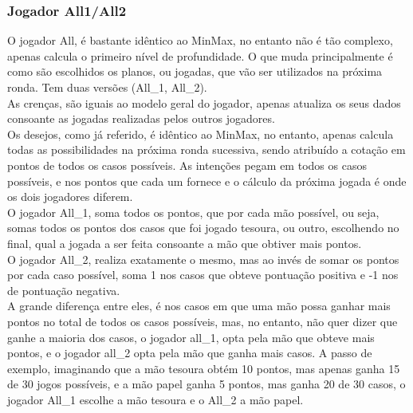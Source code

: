 \documentclass[12pt]{article}
\begin{document}
	\subsubsection*{Jogador All1/All2}
    O jogador All, é bastante idêntico ao MinMax, no entanto não é tão complexo, apenas calcula o primeiro nível de profundidade. O que muda principalmente é como são escolhidos os planos, ou jogadas, que vão ser utilizados na próxima ronda. Tem duas versões (All\_1, All\_2).\\
    As crenças, são iguais ao modelo geral do jogador, apenas atualiza os seus dados consoante as jogadas realizadas pelos outros jogadores.\\
    Os desejos, como já referido, é idêntico ao MinMax, no entanto, apenas calcula todas as possibilidades na próxima ronda sucessiva, sendo atribuído a cotação em pontos de todos os casos possíveis.
    As intenções pegam em todos os casos possíveis, e nos pontos que cada um fornece e o cálculo da próxima jogada é onde os dois jogadores diferem.\\
    O jogador All\_1, soma todos os pontos, que por cada mão possível, ou seja, somas todos os pontos dos casos que foi jogado tesoura, ou outro, escolhendo no final, qual a jogada a ser feita consoante a mão que obtiver mais pontos.\\
    O jogador All\_2, realiza exatamente o mesmo, mas ao invés de somar os pontos por cada caso possível, soma 1 nos casos que obteve pontuação positiva e -1 nos de pontuação negativa.\\
    A grande diferença entre eles, é nos casos em que uma mão possa ganhar mais pontos no total de todos os casos possíveis, mas, no entanto, não quer dizer que ganhe a maioria dos casos, o jogador all\_1, opta pela mão que obteve mais pontos, e o jogador all\_2 opta pela mão que ganha mais casos. A passo de exemplo, imaginando que a mão tesoura obtém 10 pontos, mas apenas ganha 15 de 30 jogos possíveis, e a mão papel ganha 5 pontos, mas ganha 20 de 30 casos, o jogador All\_1 escolhe a mão tesoura e o All\_2 a mão papel.\\
\end{document}
